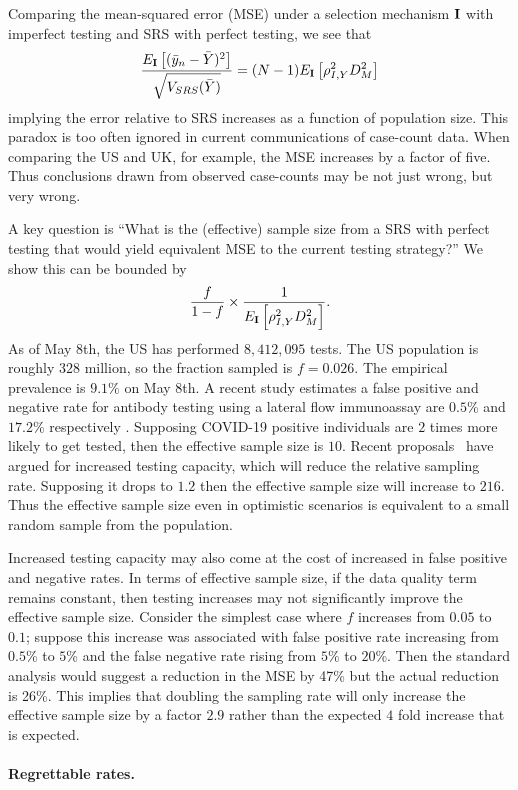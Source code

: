 \documentclass[12pt]{article}
\def\I{{\bf I}}
\begin{document}
Comparing the mean-squared error (MSE) under a selection mechanism $\I$ with imperfect testing and SRS with perfect testing, we see that
$$
\frac{E_{\I} \left[ (\bar y_n - \bar Y)^2 \right]}{\sqrt{V_{SRS} (\bar Y)}} = (N-1) E_{\I} \left[ \rho_{I,Y}^2 D_M^2 \right]
$$
implying the error relative to SRS increases as a function of population size. This paradox is too often ignored in current communications of case-count data.  When comparing the US and UK, for example, the MSE increases by a factor of five.  Thus conclusions drawn from observed case-counts may be not just wrong, but very wrong.

A key question is ``What is the (effective) sample size from a SRS with perfect testing that would yield equivalent MSE to the current testing strategy?'' We show this can be bounded by
$$
\frac{f}{1-f} \times \frac{1}{E_{\I} \left[ \rho_{I,Y}^2 D_M^2 \right]}.
$$
As of May 8th, the US has performed $8,412,095$ tests.  The US population is roughly $328$ million, so the fraction sampled is $f = 0.026$.  The empirical prevalence is $9.1\%$ on May 8th. A recent study estimates a false positive and negative rate for antibody testing using a lateral flow immunoassay are $0.5$\% and $17.2$\% respectively \cite{Bendavid2020}. Supposing COVID-19 positive individuals are $2$ times more likely to get tested, then the effective sample size is $10$.  Recent proposals~\cite{Siddarth2020} have argued for increased testing capacity, which will reduce the relative sampling rate.  Supposing it drops to $1.2$ then the effective sample size will increase to $216$.  Thus the effective sample size even in optimistic scenarios is equivalent to a small random sample from the population.

Increased testing capacity may also come at the cost of increased in false positive and negative rates.  In terms of effective sample size, if the data quality term remains constant, then testing increases may not significantly improve the effective sample size.  Consider the simplest case where $f$ increases from $0.05$ to $0.1$; suppose this increase was associated with  false positive rate increasing from $0.5$\% to $5$\% and the false negative rate rising from $5\%$ to $20$\%.  Then the standard analysis would suggest a reduction in the MSE by 47\% but the actual reduction is 26\%.  This implies that doubling the sampling rate will only increase the effective sample size by a factor $2.9$ rather than the expected $4$ fold increase that is expected.

\paragraph*{Regrettable rates.}
\end{document}
